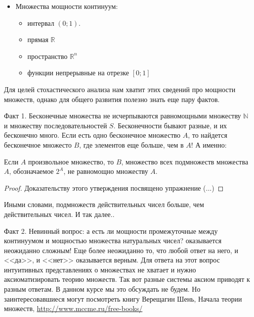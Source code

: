 {\begin{itemize}
\begin{itemize}
\item $\mathbb{Z}^{n}$
Доказательство --- по индукции. Мы уже доказали, что $ \mathbb{Z}^{1} $ --- счетное множество. Теперь предположим, что $ \mathbb{Z}^{n-1} $ --- счетное. Получаем цепочку: $ \mathbb{Z}^{n} \simeq \mathbb{Z}^{n-1}\times\mathbb{Z}^{1}\simeq \mathbb{N}\times \mathbb{N}\simeq \mathbb{N} $.
\item $\mathbb{Q}$. Пусть $ f(q) $ --- это сумма модулей числителя и знаменателя дроби (после сокращения), например, $ f(-2/3)=5 $. Сначала нумеруем дроби с $ f(q)<2 $, потом --- дроби с $ f(q)<3 $, потом --- дроби с $ f(q)<4 $ и т.д. В результате каждая дробь получает свой номер.
\end{itemize}



\item Множества мощности континуум:
\begin{itemize}
\item интервал $(0;1)$.
\item прямая $\mathbb{R}$
\item пространство $\mathbb{R}^{n}$
\item функции непрерывные на отрезке  $[0;1]$
\end{itemize}


\end{itemize}



Для целей стохастического анализа нам хватит этих сведений про мощности множеств, однако для общего развития полезно знать еще пару фактов.

Факт 1. Бесконечные множества не исчерпываются равномощными множеству $\mathbb{N}$ и множеству последовательностей $S$. Бесконечности бывают разные, и их бесконечно много. Если есть одно бесконечное множество $A$, то найдется бесконечное множесто $B$, где элементов еще больше, чем в $A$! А именно:

\begin{myth} Если $A$ произвольное множество, то $B$, множество всех подмножеств множества $A$, обозначаемое $2^{A}$, не равномощно множеству $A$.
\end{myth}
\begin{proof} Доказательству этого утверждения посвящено упражнение (...)
\end{proof}
Иными словами, подмножеств действительных чисел больше, чем действительных чисел. И так далее..

Факт 2. Невинный вопрос: а есть ли мощности промежуточные между континуумом и мощностью множества натуральных чисел? оказывается неожиданно сложным! Еще более неожиданно то, что любой ответ на него, и <<да>>, и <<нет>> оказывается верным. Для ответа на этот вопрос интуитивных представлениях о множествах не хватает и нужно аксиоматизировать теорию множеств. Так вот разные системы аксиом приводят к разным ответам. В данном курсе мы это обсуждать не будем. Но заинтересовавшиеся могут посмотреть книгу Верещагин Шень, Начала теории множеств,
\url{http://www.mccme.ru/free-books/}


}
